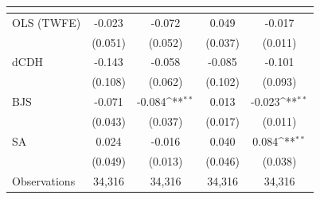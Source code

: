 {
\def\sym#1{\ifmmode^{#1}\else\(^{#1}\)\fi}
\begin{tabular}{l*{4}{c}}
\toprule
            &&&&\\
\midrule
OLS (TWFE) & -0.023 & -0.072 & 0.049 & -0.017 \\
             & (0.051) & (0.052) & (0.037) & (0.011) \\
dCDH & -0.143 & -0.058 & -0.085 & -0.101 \\
             & (0.108) & (0.062) & (0.102) & (0.093) \\
BJS & -0.071 & -0.084\sym{**} & 0.013 & -0.023\sym{**} \\
             & (0.043) & (0.037) & (0.017) & (0.011) \\
SA & 0.024 & -0.016 & 0.040 & 0.084\sym{**} \\
             & (0.049) & (0.013) & (0.046) & (0.038) \\
\midrule
Observations & 34,316 & 34,316 & 34,316 & 34,316 \\
\bottomrule
\end{tabular}
}
